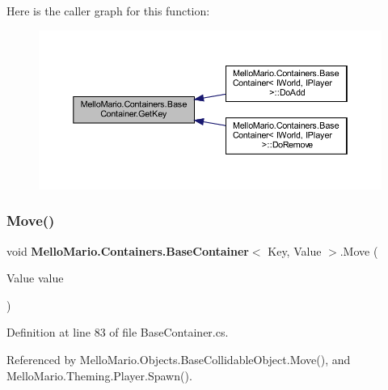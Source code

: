 Here is the caller graph for this function\+:
\nopagebreak
\begin{figure}[H]
\begin{center}
\leavevmode
\includegraphics[width=350pt]{classMelloMario_1_1Containers_1_1BaseContainer_a73f9df110a2f12619e088e96991537fc_icgraph}
\end{center}
\end{figure}
\mbox{\label{classMelloMario_1_1Containers_1_1BaseContainer_a2530ad4f8d59f78dccd177bc8007075f}} 
\subsubsection{Move()}
{\footnotesize\ttfamily void \textbf{ Mello\+Mario.\+Containers.\+Base\+Container}$<$ Key, Value $>$.Move (\begin{DoxyParamCaption}\item[{Value}]{value }\end{DoxyParamCaption})}



Definition at line 83 of file Base\+Container.\+cs.



Referenced by Mello\+Mario.\+Objects.\+Base\+Collidable\+Object.\+Move(), and Mello\+Mario.\+Theming.\+Player.\+Spawn().


